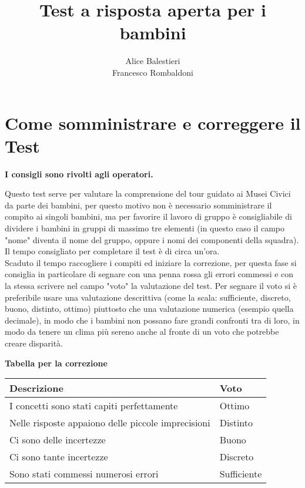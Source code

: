 \documentclass[hidelinks,12pt,a4paper]{exam}
\begin{document}
	
	\title{\textbf{Test a risposta aperta per i bambini}}
	\author{Alice Balestieri\\Francesco Rombaldoni}
	\date{}
	\maketitle
	
	\newpage
	
	\tableofcontents
	\newpage
	
	\section{Come somministrare e correggere il Test}
	\begin{center}
		\textbf{I consigli sono rivolti agli operatori.}
	\end{center}
	
	Questo test serve per valutare la comprensione del tour guidato ai Musei Civici da parte dei bambini, per questo motivo non è necessario somministrare il compito ai singoli bambini, ma per favorire il lavoro di gruppo è consigliabile di dividere i bambini in gruppi di massimo tre elementi (in questo caso il campo "nome" diventa il nome del gruppo, oppure i nomi dei componenti della squadra). Il tempo consigliato per completare il test è di circa un'ora.\\
	Scaduto il tempo raccogliere i compiti ed iniziare la correzione, per questa fase si consiglia in particolare di segnare con una penna rossa gli errori commessi e con la stessa scrivere nel campo "voto" la valutazione del test. Per segnare il voto si è preferibile usare una valutazione descrittiva (come la scala: sufficiente, discreto, buono, distinto, ottimo) piuttosto che una valutazione numerica (esempio quella decimale), in modo che i bambini non possano fare grandi confronti tra di loro, in modo da tenere un clima più sereno anche al fronte di un voto che potrebbe creare disparità.\\
	
	\begin{center}
		\large{\textbf{Tabella per la correzione}}\\
		\bigskip
		
		\begin{tabularx}{0.5\textwidth} { 
				| >{\raggedright\arraybackslash}X 
				| >{\centering\arraybackslash}X | }
			\hline
			\textbf{Descrizione} & \textbf{Voto} \\
			\hline
			I concetti sono stati capiti perfettamente & Ottimo\\
			\hline
			Nelle risposte appaiono delle piccole imprecisioni & Distinto\\
			\hline
			Ci sono delle incertezze & Buono\\
			\hline
			Ci sono tante incertezze & Discreto\\
			\hline
			Sono stati commessi numerosi errori & Sufficiente\\
			\hline
		\end{tabularx}
	\end{center}
	
\end{document}
